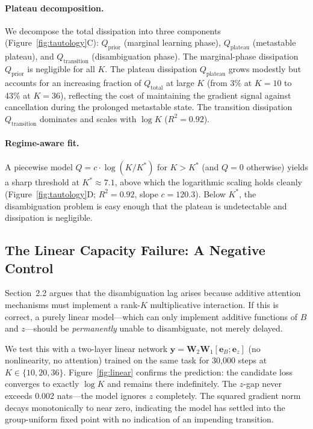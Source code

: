 \paragraph{Plateau decomposition.}
We decompose the total dissipation into three components (Figure~\ref{fig:tautology}C): $Q_\text{prior}$ (marginal learning phase), $Q_\text{plateau}$ (metastable plateau), and $Q_\text{transition}$ (disambiguation phase). The marginal-phase dissipation $Q_\text{prior}$ is negligible for all $K$. The plateau dissipation $Q_\text{plateau}$ grows modestly but accounts for an increasing fraction of $Q_\text{total}$ at large $K$ (from 3\% at $K{=}10$ to 43\% at $K{=}36$), reflecting the cost of maintaining the gradient signal against cancellation during the prolonged metastable state. The transition dissipation $Q_\text{transition}$ dominates and scales with $\log K$ ($R^2 = 0.92$).

\paragraph{Regime-aware fit.}
A piecewise model $Q = c \cdot \log(K / K^*)$ for $K > K^*$ (and $Q = 0$ otherwise) yields a sharp threshold at $K^* \approx 7.1$, above which the logarithmic scaling holds cleanly (Figure~\ref{fig:tautology}D; $R^2 = 0.92$, slope $c = 120.3$). Below $K^*$, the disambiguation problem is easy enough that the plateau is undetectable and dissipation is negligible.

\subsection{The Linear Capacity Failure: A Negative Control}

Section~2.2 argues that the disambiguation lag arises because additive attention mechanisms must implement a rank-$K$ multiplicative interaction. If this is correct, a purely linear model---which can only implement additive functions of $B$ and $z$---should be \emph{permanently} unable to disambiguate, not merely delayed.

We test this with a two-layer linear network $\mathbf{y} = \mathbf{W}_2 \mathbf{W}_1 [\mathbf{e}_B; \mathbf{e}_z]$ (no nonlinearity, no attention) trained on the same task for 30{,}000 steps at $K \in \{10, 20, 36\}$. Figure~\ref{fig:linear} confirms the prediction: the candidate loss converges to exactly $\log K$ and remains there indefinitely. The $z$-gap never exceeds 0.002 nats---the model ignores $z$ completely. The squared gradient norm decays monotonically to near zero, indicating the model has settled into the group-uniform fixed point with no indication of an impending transition.

